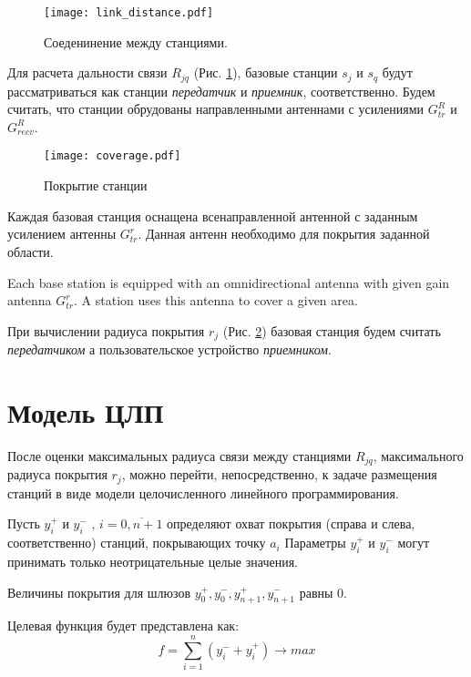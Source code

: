 \begin{figure}[h!]
  \centering
   \texttt{[image: link\_distance.pdf]}
\caption{Соеденинение между станциями.}
\label{fig:part3_link_distance}
\end{figure}

Для расчета дальности связи $R_{jq}$ (Рис. \cref{fig:part3_link_distance}), базовые станции $s_j$ и $s_q$ будут рассматриваться как станции \textit{передатчик} и \textit{приемник}, соответственно. Будем считать, что станции обрудованы направленными антеннами с усилениями $G_{tr}^{R}$ и $G_{recv}^{R}$.

\begin{figure}[h!]
  \centering
   \texttt{[image: coverage.pdf]}
\caption{Покрытие станции}
\label{fig:part3_coverage}
\end{figure}

Каждая базовая станция оснащена всенаправленной антенной с заданным усилением антенны $G_ {tr}^{r}$. Данная антенн необходимо для покрытия заданной области.

Each base station is equipped with an omnidirectional antenna with given gain antenna $G_{tr}^{r}$. A station uses this antenna to cover a given area.

При вычислении радиуса покрытия $r_j$ (Рис.  \cref{fig:part3_coverage}) базовая станция будем считать \textit{передатчиком} а пользовательское устройство \textit{приемником}.

\section{Модель ЦЛП}

После оценки максимальных радиуса связи между станциями $R_{jq}$, максимального радиуса покрытия $r_j$, можно перейти, непосредственно, к задаче размещения станций в виде модели целочисленного линейного программирования.

Пусть $y_i^+$ и $y_i^-$ , $i= \overline{0,n+1}$ определяют охват покрытия (справа и слева, соответственно) станций, покрывающих точку $a_i$ Параметры $y_i^+$ и $y_i^-$ могут принимать только неотрицательные целые значения.

Величины  покрытия для шлюзов $y_0^+, y_0^-, y_{n+1}^+, y_{n+1}^-$ равны 0.


Целевая функция будет представлена как:
\begin{equation}
  \label{eq:part3_objective_function}
  f =  \sum\limits_{i=1}^n (y_i^- + y_i^+) \rightarrow max
\end{equation}

